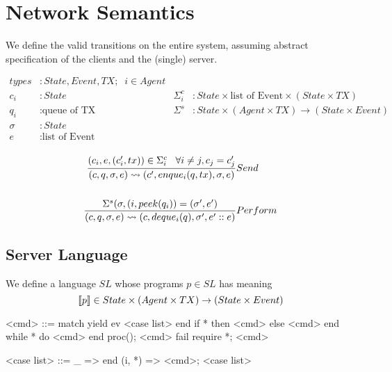 \documentclass[acmsmall,review,anonymous]{acmart}\settopmatter{printfolios=true}
\begin{document}




\maketitle

\section{Network Semantics}

We define the valid transitions on the entire system, assuming abstract specification of the clients and the (single) server.

\begin{align*}
types &: State, Event, TX; \;\; i \in Agent \\
c_i &: State \; & \Sigma^{c}_{i} &: State \times \text{list of Event} \times (State \times TX) \\
q_i &: \text{queue of TX} \; & \Sigma^{s} &: State \times (Agent \times TX) \rightarrow (State \times Event) \\
\sigma &: State \\
e &: \text{list of Event} \\
\end{align*}

\begin{align*}
\judge{&Send}{
	(c_i, e, (c'_i, tx)) \in \Sigma^{c}_i \;\;\; \forall i\neq j, c_j=c'_j
}{
	(c, q, \sigma, e) \leadsto (c', enque_i(q, tx), \sigma, e)
}
\\
\\
\judge{&Perform}{
    \Sigma^{s}(\sigma, (i, peek(q_i) ) = (\sigma', e')
}{
	(c, q, \sigma, e) \leadsto (c, deque_i(q), \sigma', e'::e)
}
\end{align*}

\pagebreak

\setlength{\grammarindent }{2cm}

\subsection{Server Language}

We define a language $SL$ whose programs $p\in SL$ has meaning \[\semfunc[p] \in State \times (Agent \times TX) \rightarrow (State \times Event)\]

\begin{grammar}
	<cmd> ::= match yield ev <case list> end   %
         \alt if * then <cmd> else <cmd> end   %
         \alt while * do <cmd> end             %
         \alt proc(); <cmd>
         \alt fail
         \alt require *; <cmd>

    <case list> ::= \_ => end
        \alt (i, *) => <cmd>; <case list>
\end{grammar}
\end{document}
